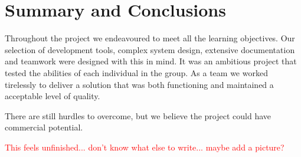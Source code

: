 \documentclass[11pt,a4paper,titlepage]{report}
\begin{document}
\section{Summary and Conclusions}

Throughout the project we endeavoured to meet all the learning objectives. Our selection of development tools, complex system design, extensive documentation and teamwork were designed with this in mind. It was an ambitious project that tested the abilities of each individual in the group. As a team we worked tirelessly to deliver a solution that was both functioning and maintained a acceptable level of quality.

There are still hurdles to overcome, but we believe the project could have commercial potential.

\textcolor{red}{This feels unfinished... don't know what else to write... maybe add  a picture?}
\end{document}
